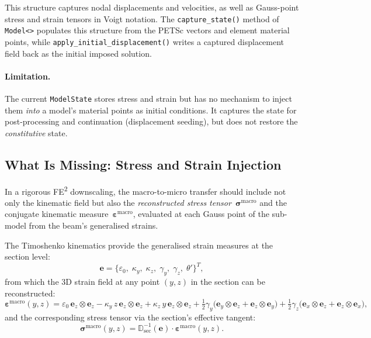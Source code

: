 This structure captures nodal displacements and velocities, as well as
Gauss-point stress and strain tensors in Voigt notation.
The \texttt{capture\_state()} method of \texttt{Model<>} populates
this structure from the PETSc vectors and element material points,
while \texttt{apply\_initial\_displacement()} writes a captured
displacement field back as the initial imposed solution.

\paragraph{Limitation.}  The current \texttt{ModelState} stores
stress and strain but has no mechanism to inject them \emph{into} a
model's material points as initial conditions.  It captures the state
for post-processing and continuation (displacement seeding), but does
not restore the \emph{constitutive} state.

\subsection{What Is Missing: Stress and Strain Injection}
\label{ssec:stress-injection}

In a rigorous FE\textsuperscript{2} downscaling, the macro-to-micro
transfer should include not only the kinematic field but also the
\emph{reconstructed stress tensor}~$\boldsymbol{\sigma}^{\text{macro}}$
and the conjugate kinematic measure~$\boldsymbol{\varepsilon}^{\text{macro}}$,
evaluated at each Gauss point of the sub-model from the beam's generalised
strains.

The Timoshenko kinematics provide the generalised strain measures at
the section level:
\begin{equation}
  \mathbf{e} = \bigl\{
    \varepsilon_0,\; \kappa_y,\; \kappa_z,\;
    \gamma_y,\; \gamma_z,\; \theta'
  \bigr\}^T,
  \label{eq:gen-strains}
\end{equation}
from which the 3D strain field at any point $(y,z)$ in the section can
be reconstructed:
\begin{equation}
  \boldsymbol{\varepsilon}^{\text{macro}}(y,z) =
    \varepsilon_0\,\mathbf{e}_z \otimes \mathbf{e}_z
    - \kappa_y\,z\,\mathbf{e}_z \otimes \mathbf{e}_z
    + \kappa_z\,y\,\mathbf{e}_z \otimes \mathbf{e}_z
    + \tfrac{1}{2}\gamma_y \bigl(
        \mathbf{e}_y \otimes \mathbf{e}_z
      + \mathbf{e}_z \otimes \mathbf{e}_y\bigr)
    + \tfrac{1}{2}\gamma_z \bigl(
        \mathbf{e}_x \otimes \mathbf{e}_z
      + \mathbf{e}_z \otimes \mathbf{e}_x\bigr),
  \label{eq:strain-reconstruction}
\end{equation}
and the corresponding stress tensor via the section's effective tangent:
\begin{equation}
  \boldsymbol{\sigma}^{\text{macro}}(y,z)
    = \mathbb{D}_{\text{sec}}^{-1}(\mathbf{e}) \cdot
      \boldsymbol{\varepsilon}^{\text{macro}}(y,z).
  \label{eq:stress-reconstruction}
\end{equation}

